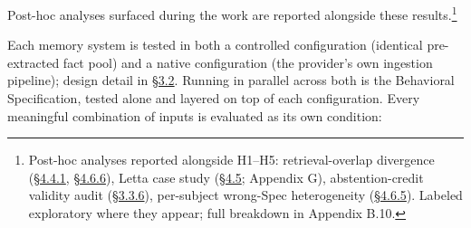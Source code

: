 Post-hoc analyses surfaced during the work are reported alongside these
results.\footnote{Post-hoc analyses reported alongside H1--H5:
  retrieval-overlap divergence (\hyperref[cross-system-retrieval-providers-do-not-converge]{§4.4.1}, \hyperref[retrieval-overlap-sensitivity-semantic-similarity-matching-k-variation]{§4.6.6}), Letta case study (\hyperref[exploratory-case-study-letta-stateful-agent-n3-post-hoc]{§4.5};
  Appendix G), abstention-credit validity audit (\hyperref[rubric-handling-limitations-post-hoc-validity-audit]{§3.3.6}), per-subject
  wrong-Spec heterogeneity (\hyperref[wrong-spec-derangement-protocol-sensitivity]{§4.6.5}). Labeled exploratory where they
  appear; full breakdown in Appendix B.10.}

Each memory system is tested in both a controlled configuration
(identical pre-extracted fact pool) and a native configuration (the
provider's own ingestion pipeline); design detail in \hyperref[experimental-conditions]{§3.2}. Running in
parallel across both is the Behavioral Specification, tested alone and
layered on top of each configuration. Every meaningful combination of
inputs is evaluated as its own condition:

